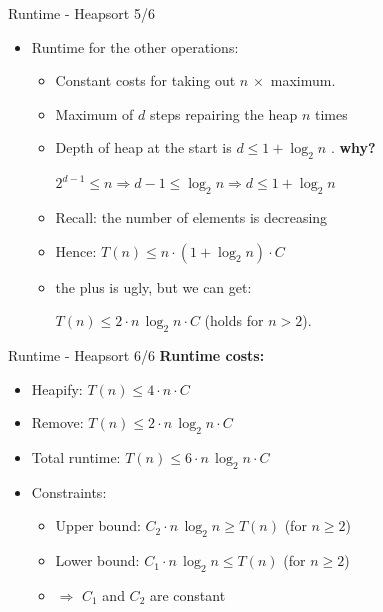 \documentclass{beamer}
\begin{document}
\begin{frame}{Runtime - Heapsort 5/6}
  \begin{itemize}
    \item 
      Runtime for the other operations: \quad{} \vspace*{-1em}
      \begin{itemize}
        \item<2->
          Constant costs for taking out $n \, \times$ maximum.
        \item<3->
          Maximum of $d$ steps repairing the heap $n$ times
        \item <4->
          Depth of heap at the start is $d \leq 1 + \log_2 n$ . \textcolor{Mittel-Gruen}{\textbf{why?}}
          \begin{center}
            \color{Mittel-Gruen} $2^{d-1} \leq n \Rightarrow d-1 \leq \log_2 n \Rightarrow d \leq 1 + \log_2 n$
          \end{center}
            \item<6->
              Recall: the number of elements is decreasing
        \item<7->
              Hence: 
              $T(n) \leq n \cdot (1 +\log_2 n) \cdot C$
            \item<8-> the plus is ugly, but we can get:
              \begin{center}
                $T(n) \leq 2 \cdot n \, \log_2 n \cdot C$ \qquad (holds for $n > 2$).
              \end{center}
          \end{itemize}
  \end{itemize}
\end{frame}


\begin{frame}{Runtime - Heapsort 6/6}
  \textbf{Runtime costs:}
  \begin{itemize}
    \item
      Heapify: $T(n) \leq 4 \cdot n \cdot C$
    \item
      Remove: $T(n) \leq 2 \cdot n \, \log_2 n \cdot C$
    \item
      Total runtime: $T(n) \leq 6 \cdot n \, \log_2 n \cdot C$
    \item
      Constraints:
      \begin{itemize}
        \item
          Upper bound:
          $C_2 \cdot n \, \log_2 n \geq T(n)$ (for $n \geq 2$)
        \item
          Lower bound:
          $C_1 \cdot n \, \log_2 n \leq T(n)$ (for $n \geq 2$)
        \item
          $\Rightarrow$ $C_1$ and $C_2$ are constant
      \end{itemize}
  \end{itemize}
\end{frame}
\end{document}
